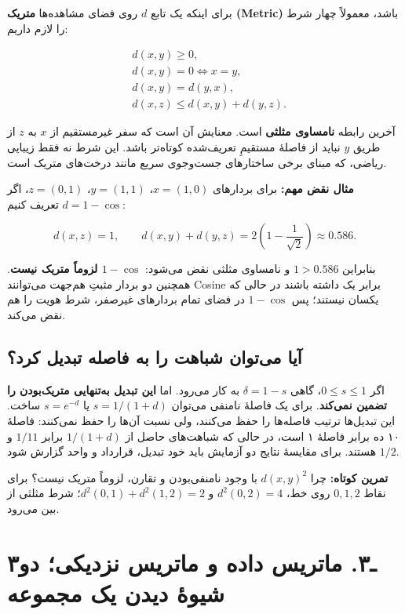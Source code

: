 \documentclass[12pt,a4paper,oneside]{book}
\begin{document}
برای اینکه یک تابع \(d\) روی فضای مشاهده‌ها \textbf{متریک (Metric)} باشد، معمولاً چهار شرط را لازم داریم:

\[
\begin{aligned}
&d(x,y)\ge 0,\\
&d(x,y)=0\iff x=y,\\
&d(x,y)=d(y,x),\\
&d(x,z)\le d(x,y)+d(y,z).
\end{aligned}
\]

آخرین رابطه \textbf{نامساوی مثلثی} است. معنایش آن است که سفر غیرمستقیم از \(x\) به \(z\) از طریق \(y\) نباید از فاصلهٔ مستقیمِ تعریف‌شده کوتاه‌تر باشد. این شرط نه فقط زیبایی ریاضی، که مبنای برخی ساختارهای جست‌وجوی سریع مانند درخت‌های متریک است.

\textbf{مثال نقض مهم:} برای بردارهای \(x=(1,0)\)، \(y=(1,1)\)، \(z=(0,1)\)، اگر \(d=1-\cos\) تعریف کنیم:

\[
d(x,z)=1,\qquad d(x,y)+d(y,z)=2\left(1-\frac{1}{\sqrt2}\right)\approx0.586.
\]

بنابراین \(1>0.586\) و نامساوی مثلثی نقض می‌شود: \textbf{\(1-\cos\) لزوماً متریک نیست}. همچنین دو بردار مثبتِ هم‌جهت می‌توانند Cosine برابر یک داشته باشند در حالی که یکسان نیستند؛ پس \(1-\cos\) در فضای تمام بردارهای غیرصفر، شرط هویت را هم نقض می‌کند.

\subsection{آیا می‌توان شباهت را به فاصله تبدیل کرد؟}\label{ux622ux6ccux627-ux645ux6ccux62aux648ux627ux646-ux634ux628ux627ux647ux62a-ux631ux627-ux628ux647-ux641ux627ux635ux644ux647-ux62aux628ux62fux6ccux644-ux6a9ux631ux62f}

اگر \(0\le s\le1\)، گاهی \(\delta=1-s\) به کار می‌رود. اما \textbf{این تبدیل به‌تنهایی متریک‌بودن را تضمین نمی‌کند}. برای یک فاصلهٔ نامنفی می‌توان \(s=1/(1+d)\) یا \(s=e^{-d}\) ساخت. این تبدیل‌ها ترتیب فاصله‌ها را حفظ می‌کنند، ولی نسبت آن‌ها را حفظ نمی‌کنند: فاصلهٔ ۱۰ ده برابر فاصلهٔ ۱ است، در حالی که شباهت‌های حاصل از \(1/(1+d)\) برابر \(1/11\) و \(1/2\) هستند. برای مقایسهٔ نتایج دو آزمایش باید خود تبدیل، قرارداد و واحد گزارش شود.

\textbf{تمرین کوتاه:} چرا \(d(x,y)^2\) با وجود نامنفی‌بودن و تقارن، لزوماً متریک نیست؟ برای نقاط \(0,1,2\) روی خط، \(d^2(0,2)=4\) و \(d^2(0,1)+d^2(1,2)=2\)؛ شرط مثلثی از بین می‌رود.

\section{۳ـ۳. ماتریس داده و ماتریس نزدیکی؛ دو شیوهٔ دیدن یک مجموعه}\label{ux640ux6f3.-ux645ux627ux62aux631ux6ccux633-ux62fux627ux62fux647-ux648-ux645ux627ux62aux631ux6ccux633-ux646ux632ux62fux6ccux6a9ux6cc-ux62fux648-ux634ux6ccux648ux647-ux62fux6ccux62fux646-ux6ccux6a9-ux645ux62cux645ux648ux639ux647}
\end{document}
